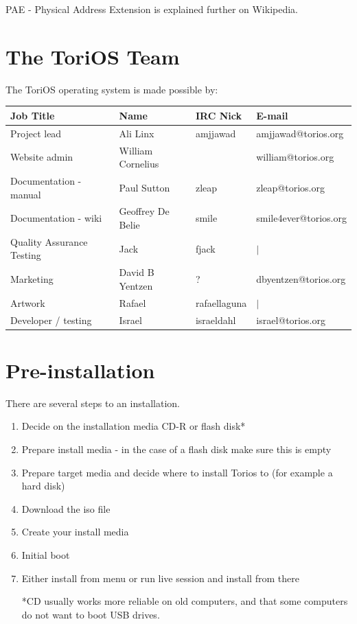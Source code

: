 \documentclass[12pt,a4paper]{book}
\begin{document}
PAE - Physical Address Extension is explained further on Wikipedia. \cite{PAE} \\

\chapter{The ToriOS Team}
The ToriOS operating system is made possible by:
\begin{center}\begin{tabular}{|l|l|l|l|}
\hline \textbf{Job Title} & \textbf{Name} & \textbf{IRC Nick} & \textbf{E-mail} \\
\hline Project lead & Ali Linx & amjjawad & amjjawad@torios.org \\
\hline Website admin & William Cornelius &  & william@torios.org \\
\hline Documentation - manual & Paul Sutton & zleap	& zleap@torios.org \\
\hline Documentation - wiki & Geoffrey De Belie & smile & smile4ever@torios.org \\
\hline Quality Assurance Testing & Jack & fjack & $|$ \\
\hline Marketing & David B Yentzen & ? & dbyentzen@torios.org \\
\hline Artwork & Rafael & rafaellaguna & $|$ \\
\hline Developer / testing & Israel & israeldahl & israel@torios.org \\
\hline \end{tabular}\end{center}


\chapter{Pre-installation}
There are several steps to an installation. \\
\begin{enumerate}
\item Decide on the installation media CD-R or flash disk* 
\item Prepare install media - in the case of a flash disk make sure this is empty
\item Prepare target media and decide where to install Torios to (for example a hard disk)
\item Download the iso file
\item Create your install media
\item Initial boot
\item Either install from menu or run live session and install from there

*CD usually works more reliable on old computers, and that some computers do not want to boot USB drives. 

\end{enumerate}
\end{document}
